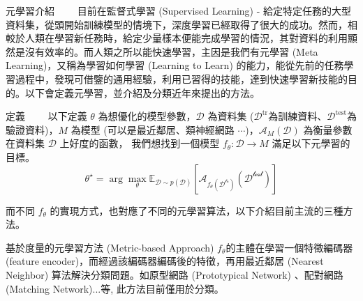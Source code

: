 \documentclass[12pt,UTF8,fntef]{article}
\begin{document}
  \begin{section}{元學習介紹}
~~~~目前在監督式學習 (Supervised Learning) - 給定特定任務的大型資料集，從頭開始訓練模型的情境下，深度學習已經取得了很大的成功。然而，相較於人類在學習新任務時，給定少量樣本便能完成學習的情況，其對資料的利用顯然是沒有效率的。而人類之所以能快速學習，主因是我們有元學習 (Meta Learning)，又稱為學習如何學習 (Learning to Learn) 的能力，能從先前的任務學習過程中，發現可借鑒的通用經驗，利用已習得的技能，達到快速學習新技能的目的。以下會定義元學習，並介紹及分類近年來提出的方法。

    \begin{subsection}{定義}
      ~~~~以下定義 $\theta$ 為想優化的模型參數，$\mathcal{D}$ 為資料集 ($\mathcal{D}^{\text{tr}}$為訓練資料、$\mathcal{D}^{\text{test}}$為驗證資料)，$M$ 為模型 (可以是最近鄰居、類神經網路 $\cdots$)，$\mathcal{A}_M(\mathcal{D})$ 為衡量參數在資料集 $\mathcal{D}$ 上好度的函數， 我們想找到一個模型 $f_\theta: \mathcal{D} \rightarrow M$ 滿足以下元學習的目標。
      \begin{equation}
        \theta^{\star} = \arg \max_\theta \mathbb{E}_{\mathcal{D} \sim p(\mathcal{D}) }[\mathcal{A}_{f_\theta(\mathcal{D^{\text{tr}}})}(\mathcal{D^{\text{test}}})]
      \end{equation}

而不同 $f_\theta$ 的實現方式，也對應了不同的元學習算法，以下介紹目前主流的三種方法。





    \end{subsection}

    \begin{subsection}{基於度量的元學習方法 (Metric-based Approach)}
      $f_\theta$的主體在學習一個特徵編碼器 (feature encoder)，而經過該編碼器編碼後的特徵，再用最近鄰居 (Nearest Neighbor) 算法解決分類問題。如原型網路 (Prototypical Network) \cite{snell2017prototypical}、配對網路 (Matching Network)\cite{vinyals2016matching}...等, 此方法目前僅用於分類。
    \end{subsection}


\end{section}
\end{document}
